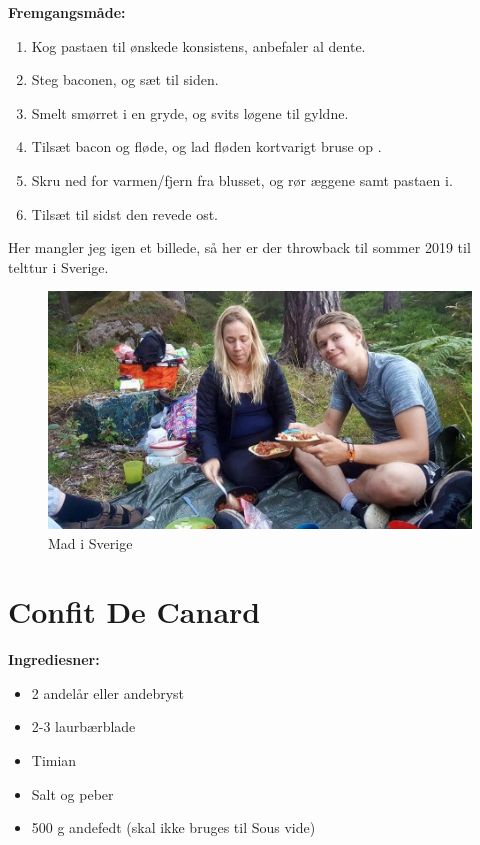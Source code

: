 \documentclass{book}
\begin{document}
\begin{minipage}[t]{0.5\textwidth}
\textbf{Fremgangsmåde:}
\begin{enumerate}
    \item Kog pastaen til ønskede konsistens, anbefaler al dente.
    \item Steg baconen, og sæt til siden.
    \item Smelt smørret i en gryde, og svits løgene til gyldne.
    \item Tilsæt bacon og fløde, og lad fløden kortvarigt bruse op .
    \item Skru ned for varmen/fjern fra blusset, og rør æggene samt pastaen i. 
    \item Tilsæt til sidst den revede ost.
\end{enumerate}
\end{minipage}
\newpage
Her mangler jeg igen et billede, så her er der throwback til sommer 2019 til telttur i Sverige.
\begin{figure}
    \centering
    \includegraphics[width=0.5\linewidth]{Skovtur_Sverige.jpg}
    \caption{Mad i Sverige}
    \label{fig:Arbitær 2}
\end{figure}
\newpage \section{Confit De Canard}
\begin{minipage}[t]{0.5\textwidth}
\textbf{Ingrediesner:} 
\begin{itemize}
    \item 2 andelår eller andebryst
    \item 2-3 laurbærblade
    \item Timian
    \item Salt og peber
    \item 500 g andefedt (skal ikke bruges til Sous vide)
\end{itemize}
\end{minipage}
\end{document}
